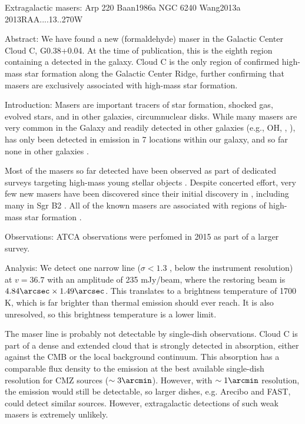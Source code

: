 Extragalactic masers:
Arp 220 Baan1986a
NGC 6240 Wang2013a 2013RAA....13..270W

Abstract:
We have found a new \formaldehyde \oneone (formaldehyde) maser in the Galactic
Center Cloud C, G0.38+0.04.  At the time of publication, this is the eighth
region containing a \formaldehyde detected in the galaxy.  Cloud C is the only
region of confirmed high-mass star formation along the Galactic Center Ridge,
further confirming that \formaldehyde masers are exclusively associated with high-mass
star formation.


Introduction:
Masers are important tracers of star formation, shocked gas, evolved stars, and
in other galaxies, circumnuclear disks.  While many masers are very common in
the Galaxy and readily detected in other galaxies (e.g., OH, \methanol,
\water), \formaldehyde has only been detected in emission in 7 locations within
our galaxy, and so far none in other galaxies \citep{Araya2007c,Mangum2008a}.

Most of the \formaldehyde masers so far detected have been observed as part of
dedicated surveys targeting high-mass young stellar objects
\citep{Araya2004a,Araya2007b,Araya2008a}.  Despite concerted effort, very few
new masers have been discovered since their initial discovery in
\citet{Forster1980a}, including many in Sgr B2
\citep{Whiteoak1983a,Mehringer1994b}.  All of the known \formaldehyde masers
are associated with regions of high-mass star formation
\citep{Pratap1994a,Araya2004a,Araya2007b,Araya2008a}.


Observations:
ATCA observations were perfomed in 2015 as part of a larger survey.

Analysis:
We detect one narrow line ($\sigma<1.3$ \kms, below the instrument resolution)
at $v=36.7$ \kms with an amplitude of 235 mJy/beam, where the restoring beam is
$4.84\arcsec\times1.49\arcsec$.  This translates to a brightness temperature of
1700 K, which is far brighter than thermal \formaldehyde emission should ever
reach.  It is also unresolved, so this brightness temperature is a lower limit.

The maser line is probably not detectable by single-dish observations.  Cloud C
is part of a dense and extended cloud that is strongly detected in absorption,
either against the CMB or the local background continuum.  This absorption has
a comparable flux density to the emission at the best available single-dish resolution
for CMZ sources ($\sim3\arcmin$).  However, with $\sim1\arcmin$ resolution, the 
emission would still be detectable, so larger dishes, e.g. Arecibo and FAST,
could detect similar sources.  However, extragalactic detections of such weak
masers is extremely unlikely.


